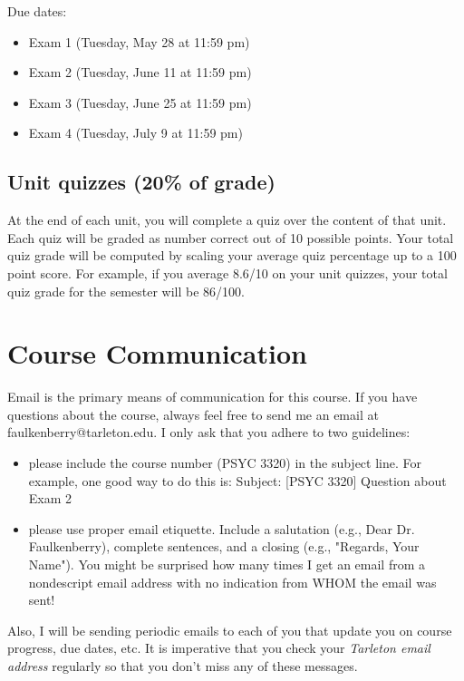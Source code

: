\documentclass[10pt]{article}
\begin{document}
Due dates:

\begin{itemize}
\item Exam 1 (Tuesday, May 28 at 11:59 pm)
\item Exam 2 (Tuesday, June 11 at 11:59 pm)
\item Exam 3 (Tuesday, June 25 at 11:59 pm)
\item Exam 4 (Tuesday, July 9 at 11:59 pm)
\end{itemize}

\subsection*{Unit quizzes (20\% of grade)}
\label{sec:org364eda1}
At the end of each unit, you will complete a quiz over the content of that 
unit. Each quiz will be graded as number correct out of 10 possible points.  Your total quiz grade will be computed by scaling your average quiz percentage up to a 100 point score.  For example, if you average 8.6/10 on your unit quizzes, your total quiz grade for the semester will be 86/100. 

\section*{Course Communication}
\label{sec:org2a76fe0}

Email is the primary means of communication for this course.  If you have questions about the course, always feel free to send me an email at faulkenberry@tarleton.edu.  I only ask that you adhere to two guidelines:
\begin{itemize}
\item please include the course number (PSYC 3320) in the subject line.  For example, one good way to do this is:  Subject: [PSYC 3320] Question about Exam 2
\item please use proper email etiquette.  Include a salutation (e.g., Dear Dr. Faulkenberry), complete sentences, and a closing (e.g., "Regards, Your Name").  You might be surprised how many times I get an email from a nondescript email address with no indication from WHOM the email was sent!
\end{itemize}

Also, I will be sending periodic emails to each of you that update you on course progress, due dates, etc.  It is imperative that you check your \emph{Tarleton email address} regularly so that you don't miss any of these messages.
\end{document}

